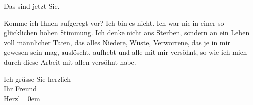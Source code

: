 \pstart
           Das sind jetzt Sie.\pend
           
\pstart
           Komme ich Ihnen aufgeregt vor? Ich bin es nicht. Ich war nie in einer so glücklichen
               hohen Stimmung. Ich denke nicht ans Sterben, sondern an ein Leben voll männlicher
               Taten, das alles Niedere, Wüste, Verworrene, das je in mir gewesen sein mag,
               auslöscht, aufhebt und alle mit mir versöhnt, so wie ich mich durch diese Arbeit mit
               allen versöhnt habe.\pend
           
\pstart
           Ich grüsse Sie herzlich{\\[\baselineskip]} Ihr Freund{\\[\baselineskip]}\spacefill\mbox{Herzl}\pend
           \leftskip=0em{}\endnumbering{}
\begin{anhang}
\end{anhang}
      